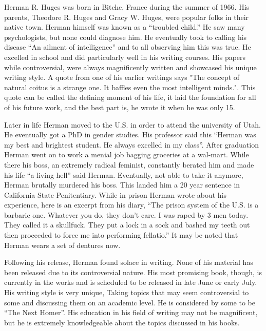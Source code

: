Herman R. Huges was born in Bitche, France during the summer of 1966. His
parents, Theodore R. Huges and Gracy W. Huges, were popular folks in their
native town. Herman himself was known as a “troubled child.” He saw many psychologists,
but none could diagnose him. He eventually took to calling his disease “An ailment of
intelligence” and to all observing him this was true. He excelled in school and
did particularly well in his writing courses. His papers while controversial,
were always magnificently written and showcased his unique writing style. A
quote from one of his earlier writings says "The concept of natural coitus is a
strange one. It baffles even the most intelligent minds.". This quote can be
called the defining moment of his life, it laid the foundation for all of his
future work, and the best part is, he wrote it when he was only 15.


       Later in life Herman moved to the U.S. in order to attend the university
of Utah. He eventually got a PhD in gender studies. His professor said this
“Herman was my best and brightest student. He always excelled in my class”. After
graduation Herman went on to work a menial job bagging groceries at a wal-mart.
While there his boss, an extremely radical feminist, constantly berated him and
made his life “a living hell” said Herman. Eventually, not able to take it
anymore, Herman brutally murdered his boss. This landed him a 20 year sentence in
California State Penitentiary. While in prison Herman wrote about his experience,
here is an excerpt from his diary, “The prison system of the U.S. is a barbaric
one. Whatever you do, they don't care. I was raped by 3 men today. They called
it a skullfuck. They put a lock in a sock and bashed my teeth out then proceeded
to force me into performing fellatio.” It may be noted that Herman wears a set
of dentures now.


       Following his release, Herman found solace in writing. None of his
material has been released due to its controversial nature. His most promising
book, though, is currently in the works and is scheduled to be released in late
June or early July. His writing style is very unique, Taking topics that may
seem controversial to some and discussing them on an academic level. He is
considered by some to be “The Next Homer”. His education in his field of writing
may not be magnificent, but he is extremely knowledgeable about the topics
discussed in his books.
